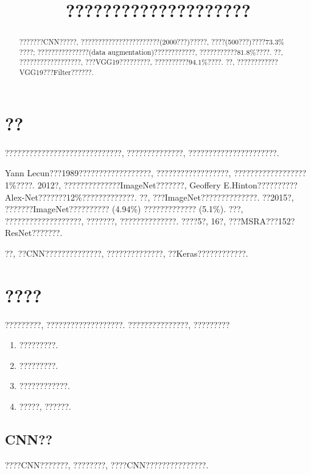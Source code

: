 \documentclass[lang=cn,11pt]{elegantpaper}
\title{????????????????????}
\date{}
\begin{document}

\newpage
\maketitle

\vspace{-25pt}
\begin{abstract}
	???????CNN?????, ???????????????????????(2000???)?????, ????(500???)????$73.3\%$????; ???????????????(data augmentation)????????????, ???????????$81.8\%$????. ??, ??????????????????, ???VGG19?????????, ??????????$94.1\%$????. ??, ????????????VGG19???Filter??????. 
\end{abstract}
	
\tableofcontents
\thispagestyle{empty}
\newpage
\normalsize
{}


\section{??}
?????????????????????????????, ??????????????, ??????????????????????. 

Yann Lecun???1989??????????????????, ??????????????????, ??????????????????1\%????. 2012?, ??????????????ImageNet???????, Geoffery E.Hinton??????????Alex-Net???????12\%?????????????. ??, ???ImageNet??????????????. ??2015?, ???????ImageNet?????????? (4.94\%) ????????????? (5.1\%). ???, ???????????????????, ???????, ??????????????. ????5?, 16?, ???MSRA???152?ResNet???????. 

??, ??CNN??????????????, ??????????????, ??Keras????????????. 


\section{????}
?????????, ???????????????????. ???????????????, ?????????

\begin{enumerate}
	\item ?????????.
	\item ?????????.
	\item ????????????.
	\item ?????, ??????.
\end{enumerate}
\subsection{CNN??}
????CNN???????, ????????, ????CNN???????????????. 
\end{document}
